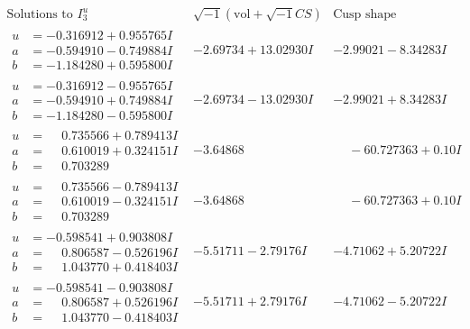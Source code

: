 \documentclass[1p]{elsarticle_modified}
\theoremstyle{definition}
\newcommand{\I}{\sqrt{-1}}
\begin{document}
$$\begin{array}{c|c|c}  
\text{Solutions to }I^u_{3}& \I (\text{vol} + \sqrt{-1}CS) & \text{Cusp shape}\\
 \hline 
\begin{aligned}
u &= -0.316912 + 0.955765 I \\
a &= -0.594910 - 0.749884 I \\
b &= -1.184280 + 0.595800 I\end{aligned}
 & -2.69734 + 13.02930 I & -2.99021 - 8.34283 I \\ \hline\begin{aligned}
u &= -0.316912 - 0.955765 I \\
a &= -0.594910 + 0.749884 I \\
b &= -1.184280 - 0.595800 I\end{aligned}
 & -2.69734 - 13.02930 I & -2.99021 + 8.34283 I \\ \hline\begin{aligned}
u &= \phantom{-}0.735566 + 0.789413 I \\
a &= \phantom{-}0.610019 + 0.324151 I \\
b &= \phantom{-}0.703289\phantom{ +0.000000I}\end{aligned}
 & -3.64868\phantom{ +0.000000I} & \phantom{-}                -6
0.727363 + 0. 10   I\phantom{ +0.000000I} \\ \hline\begin{aligned}
u &= \phantom{-}0.735566 - 0.789413 I \\
a &= \phantom{-}0.610019 - 0.324151 I \\
b &= \phantom{-}0.703289\phantom{ +0.000000I}\end{aligned}
 & -3.64868\phantom{ +0.000000I} & \phantom{-}                -6
0.727363 + 0. 10   I\phantom{ +0.000000I} \\ \hline\begin{aligned}
u &= -0.598541 + 0.903808 I \\
a &= \phantom{-}0.806587 - 0.526196 I \\
b &= \phantom{-}1.043770 + 0.418403 I\end{aligned}
 & -5.51711 - 2.79176 I & -4.71062 + 5.20722 I \\ \hline\begin{aligned}
u &= -0.598541 - 0.903808 I \\
a &= \phantom{-}0.806587 + 0.526196 I \\
b &= \phantom{-}1.043770 - 0.418403 I\end{aligned}
 & -5.51711 + 2.79176 I & -4.71062 - 5.20722 I \\ \hline\begin{aligned}

\end{aligned}
\end{array}$$
\end{document}
